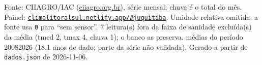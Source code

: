 \documentclass[10pt,a4paper]{article}
\begin{document}
\vspace{1pt}
{\tiny\color{cinza}
Fonte: CIIAGRO/IAC (\href{http://ciiagro.org.br}{ciiagro.org.br}), série mensal;
chuva é o total do mês. Painel:
\href{https://climalitoralsul.netlify.app/\#juquitiba}%
{\texttt{climalitoralsul.netlify.app/\#juquitiba}}.
Umidade relativa omitida: a fonte usa \texttt{0} para ``sem sensor''.  7 leitura(s) fora da faixa de sanidade excluída(s) da média (tmed 2, tmax 4, chuva 1); o banco as preserva.
médias do período 2008\textendash{}2026 (18.1 anos de dado; parte da série não validada).
Gerado a partir de \texttt{dados.json} de 2026-11-06.}
\end{document}
